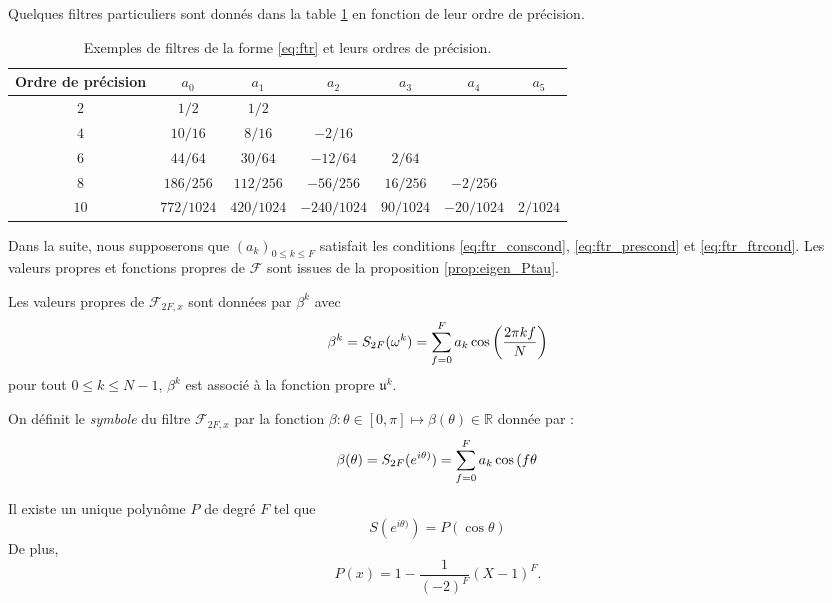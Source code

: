 Quelques filtres particuliers sont donnés dans la table \ref{tab:filter} en fonction de leur ordre de précision.
\begin{table}[htbp]
\begin{center}
\begin{tabular}{|c||cccccc|}
\hline
\textbf{Ordre de précision} & $a_0$ & $a_1$ & $a_2$ & $a_3$ & $a_4$ & $a_5$ \\
\hline \hline
$2$ & $1/2$ & $1/2$ & & & & \\
\hline
$4$ & $10/16$ & $8/16$ & $-2/16$ & & & \\
\hline
$6$ & $44/64$ & $30/64$ & $-12/64$ & $2/64$ & & \\
\hline
$8$ & $186/256$ & $112/256$ & $-56/256$ & $16/256$ & $-2/256$ & \\
\hline
$10$ & $772/1024$ & $420/1024$ & $-240/1024$ & $90/1024$ & $-20/1024$ & $2/1024$ \\
\hline
\end{tabular}
\end{center}
\caption{Exemples de filtres de la forme \eqref{eq:ftr} et leurs ordres de précision.}
\label{tab:filter}
\end{table}
Dans la suite, nous supposerons que $(a_k)_{0 \leq k \leq F}$ satisfait les conditions \eqref{eq:ftr_conscond}, \eqref{eq:ftr_prescond} et \eqref{eq:ftr_ftrcond}.
Les valeurs propres et fonctions propres de $\mathcal{F}$ sont issues de la proposition \ref{prop:eigen_Ptau}.

\begin{theoreme}
Les valeurs propres de $\mathcal{F}_{2F,x}$ sont données par $\beta^k$ avec 
\begin{equation}
\beta^k = S_{2F}(\omega^k) = \displaystyle\sum\limits_{f=0}^F a_k \cos \left( \dfrac{2 \pi k f}{N} \right)
\end{equation}
pour tout $0 \leq k \leq N-1$, $\beta^k$ est associé à la fonction propre $\mathfrak{u}^k$.
\end{theoreme}

On définit le \textit{symbole} du filtre $\mathcal{F}_{2F,x}$ par la fonction $\beta : \theta \in [0, \pi] \mapsto \beta(\theta) \in \mathbb{R}$ donnée par :
\begin{equation}
\beta (\theta) = S_{2F}(e^{i\theta)}) = \displaystyle\sum\limits_{f=0}^F a_k \cos \left( f \theta \right.
\end{equation}

\begin{proposition}
Il existe un unique polynôme $P$ de degré $F$ tel que 
\begin{equation}
S(e^{i\theta)}) = P(\cos \theta )
\end{equation}
De plus,
\begin{equation}
P(x) = 1 -\dfrac{1}{(-2)^F} (X - 1)^F.
\end{equation}
\end{proposition}

